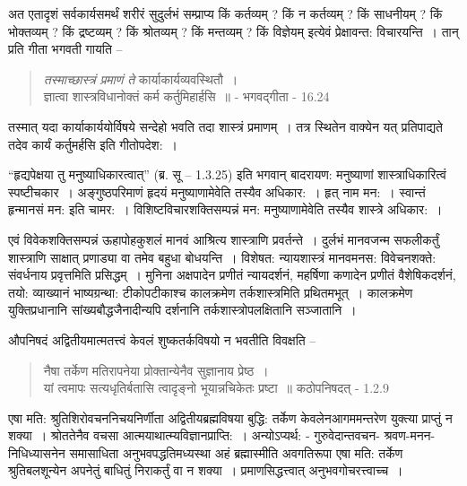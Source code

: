 {अत एतादृशं सर्वकार्यसमर्थं शरीरं सुदुर्लभं सम्प्राप्य किं कर्तव्यम् ? किं न कर्तव्यम् ? किं साधनीयम् ? किं भोक्तव्यम् ? किं द्रष्टव्यम् ? किं श्रोतव्यम् ? किं मन्तव्यम् ? किं विज्ञेयम् इत्येवं प्रेक्षावन्त: विचारयन्ति~। तान् प्रति गीता भगवती गायति –
\begin{verse}
\textit{तस्माच्छास्त्रं प्रमाणं ते} कार्याकार्यव्यवस्थितौ~। \\
ज्ञात्वा शास्त्रविधानोक्तं कर्म कर्तुमिहार्हसि~॥ - भगवद्गीता - 16.24
\end{verse}
तस्मात् यदा कार्याकार्ययोर्विषये सन्देहो भवति तदा शास्त्रं प्रमाणम्~। तत्र स्थितेन वाक्येन यत् प्रतिपाद्यते तदेव कार्यं कर्तुमर्हसि इति गीतोपदेश:~। 

“हृद्यपेक्षया तु मनुष्याधिकारत्वात्” (ब्र. सू – 1.3.25) इति भगवान् बादरायण: मनुष्याणां शास्त्राधिकारित्वं स्पष्टीचकार~। अङ्गुष्ठपरिमाणं हृदयं मनुष्याणामेवेति तस्यैव अधिकार:~। हृत् नाम मन:~। स्वान्तं हृन्मानसं मन: इति चामर:~। विशिष्टविचारशक्तिसम्पन्नं मन: मनुष्याणामेवेति तस्यैव शास्त्रे अधिकार:~। 

एवं विवेकशक्तिसम्पन्नं ऊहापोहकुशलं मानवं आश्रित्य शास्त्राणि प्रवर्तन्ते~। दुर्लभं मानवजन्म सफलीकर्तुं शास्त्राणि साक्षात् प्रणाड्या वा तमेव बहुधा बोधयन्ति~। विशेषत: न्यायशास्त्रं मानवमनस: विवेचनशक्ते: संवर्धनाय प्रवृत्तमिति प्रसिद्धम्~। मुनिना अक्षपादेन प्रणीतं न्यायदर्शनं, महर्षिणा कणादेन प्रणीतं वैशेषिकदर्शनं, तयो: व्याख्यानं भाष्यग्रन्था: टीकोपटीकाश्च कालक्रमेण तर्कशास्त्रमिति प्रथितमभूत्~। कालक्रमेण युक्तिप्रधानानि सांख्यबौद्धजैनादीन्यपि दर्शनानि तर्कशास्त्रोपलक्षितानि सञ्जातानि~। 

औपनिषदं अद्वितीयमात्मतत्त्वं केवलं शुष्कतर्कविषयो न भवतीति विवक्षति –
\begin{verse}
नैषा तर्केण मतिरापनेया प्रोक्तान्येनैव सुज्ञानाय प्रेष्ठ~। \\
यां त्वमापः सत्यधृतिर्बतासि त्वादृङ्नो भूयान्नचिकेतः प्रष्टा~॥
\hspace{6cm}कठोपनिषदत् - 1.2.9
\end{verse}
एषा मति: श्रुतिशिरोवचननिचयनिर्णीता अद्वितीयब्रह्मविषया बुद्धि: तर्केण केवलेन\break आगममन्तरेण युक्त्या प्राप्तुं न शक्या~। श्रोततेनैव वचसा आत्मयाथात्म्यविज्ञानप्राप्ति:~। अन्योऽप्यर्थ: - गुरुवेदान्तवचन- श्रवण-मनन-निधिध्यासनेन समासाधिता अनुभवपद्धति\-मध्यस्था अहं ब्रह्मास्मीति अवगतिरूपा एषा मति: तर्केण श्रुतिबलशून्येन अपनेतुं बाधितुं निराकर्तुं वा न शक्या~। प्रमाणसिद्धत्त्वात् अनुभवगोचरत्त्वाच्च~। 

}
